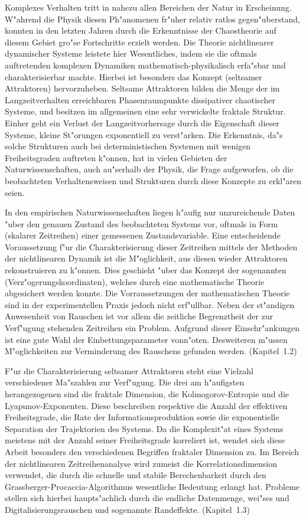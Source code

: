 

Komplexes Verhalten tritt in nahezu allen Bereichen der Natur in Erscheinung. W"ahrend die
Physik diesen Ph"anomenen fr"uher relativ ratlos gegen"uberstand, konnten in den letzten
Jahren durch die Erkenntnisse der Chaostheorie auf diesem Gebiet gro"se Fortschritte
erzielt werden. Die Theorie nichtlinearer dynamischer Systeme leistete hier Wesentliches,
indem sie die oftmals auftretenden komplexen Dynamiken mathematisch-physikalisch erfa"sbar
und charakterisierbar machte.  Hierbei ist besonders das Konzept \begriff(seltsamer Attraktoren)
hervorzuheben.  Seltsame Attraktoren bilden die Menge der im Langzeitverhalten
erreichbaren Phasenraumpunkte dissipativer chaotischer Systeme, und besitzen im allgemeinen
eine sehr verwickelte fraktale Struktur. Einher geht ein Verlust der Langzeitvorhersage
durch die Eigenschaft dieser Systeme, kleine St"orungen exponentiell zu verst"arken.  Die
Erkenntnis, da"s solche Strukturen auch bei deterministischen Systemen mit wenigen
Freiheitsgraden auftreten k"onnen, hat in vielen Gebieten der Naturwissenschaften, auch
au"serhalb der Physik, die Frage aufgeworfen, ob die beobachteten Verhaltensweisen und
Strukturen durch diese Konzepte zu erkl"aren seien.


In den empirischen Naturwissenschaften liegen h"aufig nur unzureichende Daten "uber den
genauen Zustand des beobachteten Systems vor, oftmals in Form \begriff(skalarer
Zeitreihen) einer gemessenen Zustandsvariable.  Eine entscheidende Voraussetzung f"ur die
Charakterisierung dieser Zeitreihen mittels der Methoden der nichtlinearen Dynamik ist
die M"oglichkeit, aus diesen wieder Attraktoren rekonstruieren zu k"onnen.  Dies geschieht
"uber das Konzept der sogenannten \begriff(Verz"ogerungskoordinaten), welches durch eine
mathematische Theorie abgesichert werden konnte. Die Vorraussetzungen der mathematischen
Theorie sind in der experimentellen Praxis jedoch nicht erf"ullbar. Neben der st"andigen
Anwesenheit von Rauschen ist vor allem die zeitliche Begrenztheit der zur Verf"ugung
stehenden Zeitreihen ein Problem. Aufgrund dieser Einschr"ankungen ist eine gute Wahl der
Einbettungsparameter vonn"oten.  Desweiteren m"ussen M"oglichkeiten zur Verminderung des
Rauschens gefunden werden. (Kapitel~1.2)

F"ur die Charakterisierung seltsamer Attraktoren steht eine Vielzahl verschiedener Ma"szahlen zur
Verf"ugung. Die drei am h"aufigsten herangezogenen sind die fraktale Dimension, die
Kolmogorov-Entropie und die Lyapunov-Exponenten. Diese beschreiben respektive die Anzahl
der effektiven Freiheitsgrade, die Rate der Informationsproduktion sowie die exponentielle
Separation der Trajektorien des Systems. Da die Komplexit"at eines Systems meistens mit
der Anzahl seiner Freiheitsgrade korreliert ist, wendet sich diese Arbeit besonders den
verschiedenen Begriffen fraktaler Dimension zu.  Im Bereich der nichtlinearen
Zeitreihenanalyse wird zumeist die Korrelationsdimension verwendet, die durch die schnelle
und stabile Berechenbarkeit durch den Grassberger-Procaccia-Algorithmus wesentliche
Bedeutung erlangt hat. Probleme stellen sich hierbei haupts"achlich durch die endliche
Datenmenge, wei"ses und Digitalisierungsrauschen und sogenannte Randeffekte.  (Kapitel~1.3)

